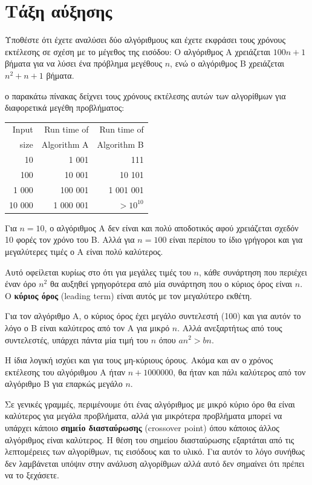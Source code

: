 \documentclass[10pt]{book}
\begin{document}
\section{Τάξη αύξησης}

Υποθέστε ότι έχετε αναλύσει δύο αλγόριθμους και έχετε εκφράσει τους χρόνους εκτέλεσης σε σχέση
με το μέγεθος της εισόδου: Ο αλγόριθμος Α χρειάζεται $100n+1$ βήματα για να λύσει ένα πρόβλημα
μεγέθους $n$, ενώ ο αλγόριθμος Β χρειάζεται $n^2 + n + 1$ βήματα.

ο παρακάτω πίνακας δείχνει τους χρόνους εκτέλεσης αυτών των αλγορίθμων για διαφορετικά μεγέθη
προβλήματος:

\begin{tabular}{|r|r|r|}
\hline
Input     &   Run time of     & Run time of \\
size      &   Algorithm A     & Algorithm B \\
\hline
10        &   1 001           & 111         \\
100       &   10 001          & 10 101         \\
1 000     &   100 001         & 1 001 001         \\
10 000    &   1 000 001       & $> 10^{10}$         \\
\hline
\end{tabular}

Για $n=10$, ο αλγόριθμος Α δεν είναι και πολύ αποδοτικός αφού χρειάζεται σχεδόν 10 φορές τον χρόνο του Β.
Αλλά για $n=100$ είναι περίπου το ίδιο γρήγοροι και για μεγαλύτερες τιμές ο Α είναι πολύ καλύτερος.

Αυτό οφείλεται κυρίως στο ότι για μεγάλες τιμές του $n$, κάθε συνάρτηση που περιέχει έναν όρο
$n^2$ θα αυξηθεί γρηγορότερα από μία συνάρτηση που ο κύριος όρος είναι $n$.
Ο {\bf κύριος όρος} (leading term) είναι αυτός με τον μεγαλύτερο εκθέτη.

Για τον αλγόριθμο Α, ο κύριος όρος έχει μεγάλο συντελεστή (100) και για αυτόν το 
λόγο ο Β είναι καλύτερος από τον Α για μικρό $n$.  Αλλά ανεξαρτήτως από τους συντελεστές,
υπάρχει πάντα μία τιμή του $n$ όπου $a n^2 > b n$.

Η ίδια λογική ισχύει και για τους μη-κύριους όρους.  Ακόμα και αν ο χρόνος εκτέλεσης του αλγόριθμου Α
ήταν $n+1000000$, θα ήταν και πάλι καλύτερος από τον αλγόριθμο Β για επαρκώς μεγάλο $n$.

Σε γενικές γραμμές, περιμένουμε ότι ένας αλγόριθμος με μικρό κύριο όρο θα είναι 
καλύτερος για μεγάλα προβλήματα, αλλά για μικρότερα προβλήματα μπορεί να υπάρχει 
κάποιο {\bf σημείο διασταύρωσης} (crossover point) όπου κάποιος άλλος αλγόριθμος είναι
καλύτερος.  Η θέση του σημείου διασταύρωσης εξαρτάται από τις λεπτομέρειες των αλγορίθμων,
τις εισόδους και το υλικό.  Για αυτόν το λόγο συνήθως δεν λαμβάνεται υπόψιν στην ανάλυση αλγορίθμων
αλλά αυτό δεν σημαίνει ότι πρέπει να το ξεχάσετε.
\end{document}
